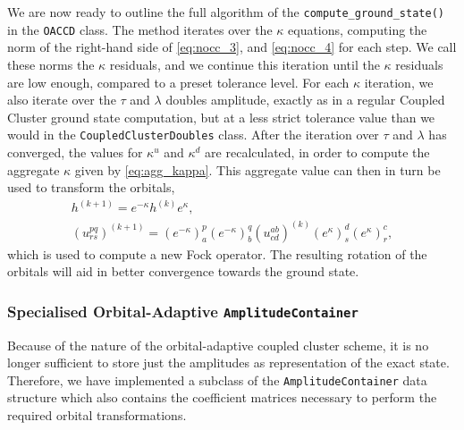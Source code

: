     We are now ready to outline the full algorithm of the 
    \lstinline{compute_ground_state()} in the \lstinline{OACCD}
    class.
    The method iterates over the $\kappa$ equations, computing the norm of
    the right-hand side 
    of \autoref{eq:nocc_3}, and \autoref{eq:nocc_4} for each step. 
    We call these norms the $\kappa$ residuals, and we continue this iteration until 
    the $\kappa$ residuals are low enough, compared to a preset tolerance level. 
    For each $\kappa$ iteration, we also iterate over the $\tau$ and $\lambda$ doubles 
    amplitude, exactly as in a regular Coupled Cluster ground state computation,
    but at a less strict tolerance value than we would in the
    \lstinline{CoupledClusterDoubles} class.
    After the iteration over $\tau$ and $\lambda$ 
    has converged, the values for $\kappa^u$ and $\kappa^d$ are recalculated, in order to 
    compute the aggregate $\kappa$ given by \autoref{eq:agg_kappa}. 
    This aggregate value can then in turn be used to transform the orbitals,
    \begin{equation*}
        \begin{gathered}
            h^{(k + 1)} = e^{-\kappa} h^{(k)} e^{\kappa}, \\
            (u^{pq}_{rs})^{(k + 1)}
            = (e^{-\kappa})^p_a (e^{-\kappa})^q_b 
                (u^{ab}_{cd})^{(k)}
            (e^{\kappa})^d_s (e^{\kappa})^c_r,
        \end{gathered}
    \end{equation*}
    which is used to compute 
    a new Fock operator. The resulting rotation of the orbitals will aid in better 
    convergence towards the ground state.

    \subsubsection{Specialised Orbital-Adaptive \lstinline{AmplitudeContainer}}

    \begin{figure}[h]
    
    \end{figure}

    Because of the nature of the orbital-adaptive coupled cluster scheme, it is no 
    longer sufficient to store just the amplitudes as representation of the exact 
    state. Therefore, we have implemented a subclass of the \lstinline{AmplitudeContainer}
    data structure which also contains the coefficient matrices necessary to perform the 
    required orbital transformations.

